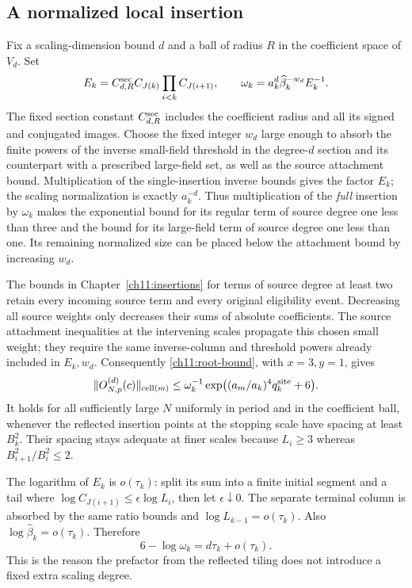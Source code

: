 \subsection{A normalized local insertion}

Fix a scaling-dimension bound $d$ and a ball of radius $R$ in the
coefficient space of $V_d$. Set
\[
 E_k=C_{d,R}^{\rm sec} C_{J(k)}\prod_{i<k}C_{J(i+1)},\qquad
 \omega_k=a_k^d\widehat\beta_k^{-w_d}E_k^{-1}.
\]
The fixed section constant $C_{d,R}^{\rm sec}$ includes the coefficient radius and all its signed and
conjugated images. Choose the fixed integer $w_d$ large enough to absorb
the finite powers of the inverse small-field threshold in the degree-$d$
section and its counterpart with a prescribed large-field set, as well as the source attachment bound. Multiplication of the single-insertion inverse bounds gives the
factor $E_k$; the scaling normalization is exactly $a_k^{-d}$.
Thus multiplication of the \emph{full} insertion by $\omega_k$
makes the exponential bound for its regular term of source degree one
less than three and the bound for its large-field term of source degree one
less than one. Its remaining normalized size can be placed below the
attachment bound by increasing $w_d$.

The bounds in Chapter~\ref{ch11:insertions} for terms of source degree at least two retain every
incoming source term and every original eligibility event. Decreasing all source
weights only decreases their sums of absolute coefficients. The source attachment
inequalities at the intervening scales propagate this chosen small
weight; they require the same inverse-column and threshold powers already
included in $E_k,w_d$. Consequently \eqref{ch11:root-bound}, with
$x=3,y=1$, gives
\begin{equation}
 \|O_{N,p}^{(d)}(c)\|_{\mathrm{cell}(m)}
 \le \omega_k^{-1}
           \exp\bigl((a_m/a_k)^4q_k^{\rm site}+6\bigr).
 \label{ch13:sharp-root}
\end{equation}
It holds for all sufficiently large $N$ uniformly in period and in the coefficient
ball, whenever the reflected insertion points at the stopping scale have spacing
at least $B_k^2$. Their spacing stays adequate at finer scales because
$L_i\ge3$ whereas $B_{i+1}^2/B_i^2\le2$.

The logarithm of $E_k$ is $o(\tau_k)$: split its sum into a finite
initial segment and a tail where
$\log C_{J(i+1)}\le\epsilon\log L_i$, then let $\epsilon\downarrow0$.
The separate terminal column is absorbed by the same ratio bounds and
$\log L_{k-1}=o(\tau_k)$. Also
$\log\widehat\beta_k=o(\tau_k)$. Therefore
\begin{equation}
                        6-\log\omega_k=d\tau_k+o(\tau_k).
 \label{ch13:weight-size}
\end{equation}
This is the reason the prefactor from the reflected tiling does not introduce a fixed
extra scaling degree.

